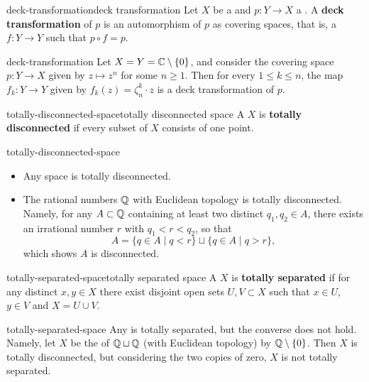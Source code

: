 \begin{topic}{deck-transformation}{deck transformation}
    Let $X$ be a  and $p \colon Y \to X$ a . A \textbf{deck transformation} of $p$ is an automorphism of $p$ as covering spaces, that is, a  $f \colon Y \to Y$ such that $p \circ f = p$.
\end{topic}

\begin{example}{deck-transformation}
    Let $X = Y = \mathbb{C} \setminus \{ 0 \}$, and consider the covering space $p \colon Y \to X$ given by $z \mapsto z^n$ for some $n \ge 1$. Then for every $1 \le k \le n$, the map $f_k \colon Y \to Y$ given by $f_k(z) = \zeta_n^k \cdot z$ is a deck transformation of $p$.
\end{example}

\begin{topic}{totally-disconnected-space}{totally disconnected space}
    A  $X$ is \textbf{totally disconnected} if every  subset of $X$ consists of one point.
\end{topic}

\begin{example}{totally-disconnected-space}
    \begin{itemize}
        \item Any  space is totally disconnected.
        \item The rational numbers $\mathbb{Q}$ with Euclidean topology is totally disconnected. Namely, for any $A \subset \mathbb{Q}$ containing at least two distinct $q_1, q_2 \in A$, there exists an irrational number $r$ with $q_1 < r < q_2$, so that
        \[ A = \{ q \in A \mid q < r \} \sqcup \{ q \in A \mid q > r \} , \]
        which shows $A$ is disconnected.
    \end{itemize}
\end{example}

\begin{topic}{totally-separated-space}{totally separated space}
    A  $X$ is \textbf{totally separated} if for any distinct $x, y \in X$ there exist disjoint open sets $U, V \subset X$ such that $x \in U$, $y \in V$ and $X = U \cup V$.
\end{topic}

\begin{example}{totally-separated-space}
    Any  is totally separated, but the converse does not hold. Namely, let $X$ be the  of $\mathbb{Q} \sqcup \mathbb{Q}$ (with Euclidean topology) by $\mathbb{Q} \setminus \{ 0 \}$. Then $X$ is totally disconnected, but considering the two copies of zero, $X$ is not totally separated.
\end{example}

